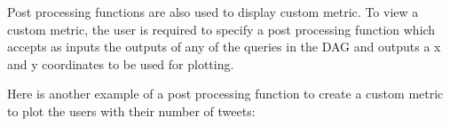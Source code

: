 \documentclass[letterpaper,10pt,english]{sphinxmanual}
\begin{document}
\begin{sphinxVerbatim}[commandchars=\\\{\}]
 
      \PYG{p}{[}\PYG{p}{]}
      \PYG{p}{[}\PYG{p}{]}
       
            

      
    \PYG{p}{[}\PYG{p}{]}  
     
\end{sphinxVerbatim}

Post processing functions are also used to display custom metric. To view a custom metric, the user is required to specify a post processing function which accepts as inputs the outputs of any of the queries in the DAG and outputs a x and y coordinates to be used for plotting.

Here is another example of a post processing function to create a custom metric to plot the users with their number of tweets:
\end{document}
